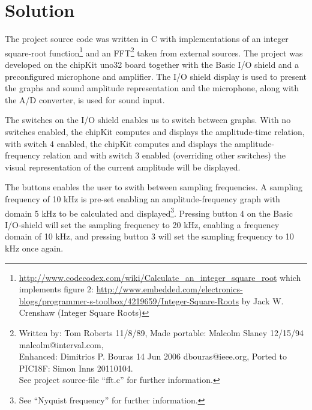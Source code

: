 \documentclass[a4paper,11pt]{article}
\begin{document}
\section*{Solution}
The project source code was written in C with implementations of an integer square-root function\footnote{\url{http://www.codecodex.com/wiki/Calculate_an_integer_square_root} which implements figure 2: \url{http://www.embedded.com/electronics-blogs/programmer-s-toolbox/4219659/Integer-Square-Roots} by Jack W. Crenshaw (Integer Square Roots)} 
and an FFT\footnote{Written by:  Tom Roberts  11/8/89, Made portable:  Malcolm Slaney 12/15/94 malcolm@interval.com, \\Enhanced:  Dimitrios P. Bouras  14 Jun 2006 dbouras@ieee.org, Ported to PIC18F:  Simon Inns 20110104.\\ See project source-file ``fft.c'' for further information.} 
taken from external sources. The project was developed on the chipKit uno32 board together with the Basic I/O shield and a preconfigured microphone and amplifier. The I/O shield display is used to present the graphs and sound amplitude representation and the microphone, along with the A/D converter, is used for sound input. 

The switches on the I/O shield enables us to switch between graphs. With no switches enabled, the chipKit computes and displays the amplitude-time relation, with switch 4 enabled, the chipKit computes and displays the amplitude-frequency relation and with switch 3 enabled (overriding other switches) the visual representation of the current amplitude will be displayed.

The buttons enables the user to swith between sampling frequencies. A sampling frequency of 10 kHz is pre-set enabling an amplitude-frequency graph with domain 5 kHz to be calculated and displayed\footnote{See ``Nyquist frequency'' for further information.}. Pressing button 4 on the Basic I/O-shield will set the sampling frequency to 20 kHz, enabling a frequency domain of 10 kHz, and pressing button 3 will set the sampling frequency to 10 kHz once again.
\end{document}
